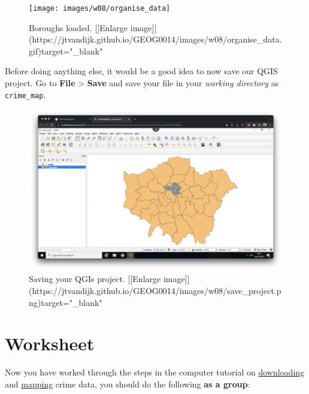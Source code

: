 \documentclass[
]{book}
\begin{document}
\begin{figure}

{\centering \texttt{[image: images/w08/organise\_data]} 

}

\caption{Boroughs loaded. [[Enlarge image]](https://jtvandijk.github.io/GEOG0014/images/w08/organise_data.gif){target="_blank"}}\label{fig:organise-data}
\end{figure}

Before doing anything else, it would be a good idea to now save our QGIS project. Go to \textbf{File} \textgreater{} \textbf{Save} and save your file in your \emph{working directory} as \texttt{crime\_map}.

\begin{figure}

{\centering \includegraphics[width=850pt]{images/w08/save_project} 

}

\caption{Saving your QGIs project. [[Enlarge image]](https://jtvandijk.github.io/GEOG0014/images/w08/save_project.png){target="_blank"}}\label{fig:save-project}
\end{figure}

\hypertarget{worksheet}{%
\section*{Worksheet}\label{worksheet}}

Now you have worked through the steps in the computer tutorial on \protect\hyperlink{downloading-crime-data}{downloading} and \protect\hyperlink{mapping-crime-data}{mapping} crime data, you should do the following \textbf{as a group}:
\end{document}
